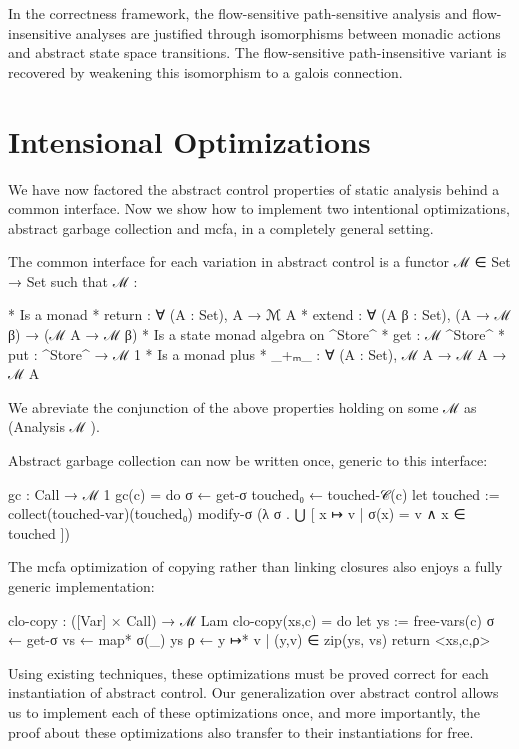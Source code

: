 \documentclass{article}
\begin{document}
In the correctness framework, the flow-sensitive path-sensitive analysis and
flow-insensitive analyses are justified through isomorphisms between monadic
actions and abstract state space transitions.  The flow-sensitive
path-insensitive variant is recovered by weakening this isomorphism to a galois
connection.



\section{Intensional Optimizations}
\label{section:IntensionalOptimizations}

We have now factored the abstract control properties of static analysis behind
a common interface.  Now we show how to implement two intentional
optimizations, abstract garbage collection and mcfa, in a completely general
setting.

The common interface for each variation in abstract control is a functor ℳ  ∈
Set → Set such that ℳ :

* Is a monad
  * return : ∀ (A : Set), A → ℳ  A
  * extend : ∀ (A β : Set), (A → ℳ  β) → (ℳ  A → ℳ  β)
* Is a state monad algebra on ^Store^
  * get : ℳ  ^Store^
  * put : ^Store^ → ℳ  1
* Is a monad plus
  * _+ₘ_ : ∀ (A : Set), ℳ  A → ℳ  A → ℳ  A

We abreviate the conjunction of the above properties holding on some ℳ  as
(Analysis ℳ ).

Abstract garbage collection can now be written once, generic to this interface:

gc : Call → ℳ  1
gc(c) = do
  σ ← get-σ
  touched₀ ← touched-𝒞(c)
  let touched := collect(touched-var)(touched₀)
  modify-σ (λ σ . ⋃ [ {x ↦ v} | σ(x) = v ∧ x ∈ touched ])

The mcfa optimization of copying rather than linking closures also enjoys a
fully generic implementation:

clo-copy : ([Var] × Call) → ℳ  Lam
clo-copy(xs,c) = do
  let ys := free-vars(c)
  σ ← get-σ
  vs ← map* σ(_) ys
  ρ ← { y ↦* v | (y,v) ∈ zip(ys, vs) }
  return <xs,c,ρ>

Using existing techniques, these optimizations must be proved correct for each
instantiation of abstract control.  Our generalization over abstract control
allows us to implement each of these optimizations once, and more importantly,
the proof about these optimizations also transfer to their instantiations for
free.
\end{document}
